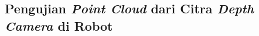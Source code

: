 \subsection{Pengujian \emph{Point Cloud} dari Citra \emph{Depth Camera} di Robot}
\label{subsec:pointcloudrobot}

\textcolor{red}{\lipsum[1-2]}
